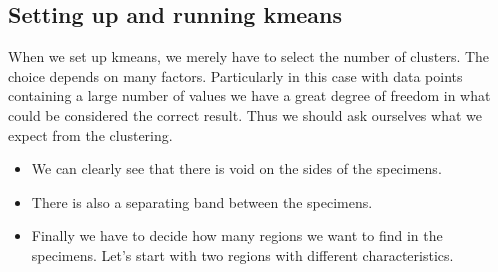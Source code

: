 \documentclass[letterpaper,10pt,english]{sphinxmanual}
\begin{document}
\subsection{Setting up and running k\sphinxhyphen{}means}
\label{\detokenize{ML4NeutronImageSegmentation:setting-up-and-running-k-means}}
When we set up k\sphinxhyphen{}means, we merely have to select the number of clusters. The choice depends on many factors. Particularly in this case with data points containing a large number of values we have a great degree of freedom in what could be considered the correct result. Thus we should ask ourselves what we expect from the clustering.
\begin{itemize}
\item {} 
We can clearly see that there is void on the sides of the specimens.

\item {} 
There is also a separating band between the specimens.

\item {} 
Finally we have to decide how many regions we want to find in the specimens. Let’s start with two regions with different characteristics.

\end{itemize}

\begin{sphinxVerbatim}[commandchars=\\\{\}]
        
   \PYG{p}{[}\PYG{p}{]} 
               
\end{sphinxVerbatim}

\end{document}
